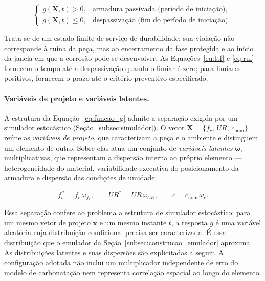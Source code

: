 \begin{equation}\label{eq:dominio_falha}
\begin{cases}
g(\mathbf{X}, t) > 0,    & \text{armadura passivada (per\'iodo de inicia\c{c}\~ao)}, \\[4pt]
g(\mathbf{X}, t) \leq 0, & \text{despassiva\c{c}\~ao (fim do per\'iodo de inicia\c{c}\~ao)}.
\end{cases}
\end{equation}

Trata-se de um estado limite de serviço de durabilidade: sua violação não corresponde à ruína da peça, mas ao encerramento da fase protegida e ao início da janela em que a corrosão pode se desenvolver. As Equações~\eqref{eq:ttf} e \eqref{eq:rul} fornecem o tempo até a despassivação quando o limiar é zero; para limiares positivos, fornecem o prazo até o critério preventivo especificado.

\paragraph{Vari\'aveis de projeto e vari\'aveis latentes.} A estrutura da Equação~\eqref{eq:funcao_g} admite a separação exigida por um simulador estocástico (Seção~\ref{subsec:simulador}). O vetor $\mathbf{X} = \{f_c,\, UR,\, c_{\mathrm{nom}}\}$ reúne as \textit{variáveis de projeto}, que caracterizam a peça e o ambiente e distinguem um elemento de outro. Sobre elas atua um conjunto de \textit{variáveis latentes} $\boldsymbol{\omega}$, multiplicativas, que representam a dispersão interna ao próprio elemento --- heterogeneidade do material, variabilidade executiva do posicionamento da armadura e dispersão das condições de umidade:

\begin{equation}\label{eq:latentes}
f_c^{\,\ast} = f_c\,\omega_{f_c}, \qquad UR^{\ast} = UR\,\omega_{UR}, \qquad c = c_{\mathrm{nom}}\,\omega_{c}.
\end{equation}

Essa separação confere ao problema a estrutura de simulador estocástico: para um mesmo vetor de projeto $\mathbf{x}$ e um mesmo instante $t$, a resposta $g$ é uma variável aleatória cuja distribuição condicional precisa ser caracterizada. É essa distribuição que o emulador da Seção~\ref{subsec:construcao_emulador} aproxima. As distribuições latentes e suas dispersões são explicitadas a seguir. A configuração adotada não inclui um multiplicador independente de erro do modelo de carbonatação nem representa correlação espacial ao longo do elemento.

